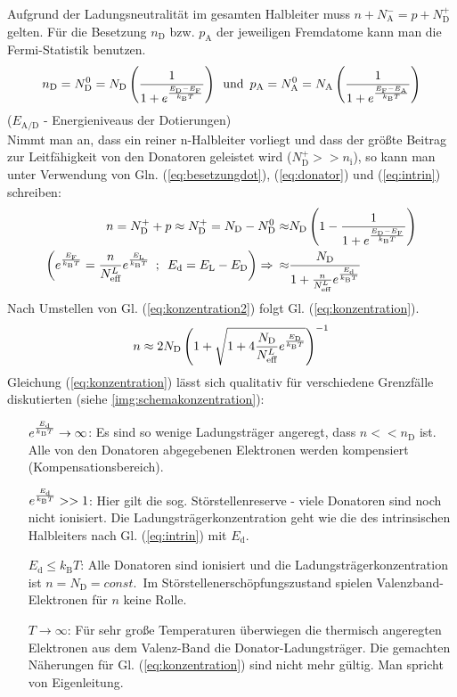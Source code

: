 \documentclass[numbers=noenddot,14pt,a4paper]{scrartcl}
\newcommand{\ix}[1]{_\text{#1}}
\newcommand{\euler}{\mathnormal{e}}
\begin{document}
Aufgrund der Ladungsneutralität im gesamten Halbleiter muss \mbox{$n+N\ix{A}^-=p+N\ix{D}^+$} gelten. Für die Besetzung $n\ix{D}$ bzw. $p\ix{A}$ der jeweiligen Fremdatome kann man die Fermi-Statistik benutzen.
\begin{align}
	n\ix{D}=N\ix{D}^0=N\ix{D}\left(\frac{1}{1+\euler^{\frac{E\ix{D}-E\ix{F}}{k\ix{B}T}}}\right) \,\,\, \text{und} \,\,\, p\ix{A}=N\ix{A}^0=N\ix{A}\left(\frac{1}{1+\euler^{\frac{E\ix{F}-E\ix{A}}{k\ix{B}T}}}\right) \label{eq:besetzungdot}
\end{align}
($E\ix{A/D}$ - Energieniveaus der Dotierungen)\\
Nimmt man an, dass ein reiner n-Halbleiter vorliegt und dass der größte Beitrag zur Leitfähigkeit von den Donatoren geleistet wird ($N\ix{D}^+>>n\ix{i}$), so kann man unter Verwendung von Gln. (\ref{eq:besetzungdot}), (\ref{eq:donator})  und (\ref{eq:intrin}) schreiben:
\begin{align}
	n=N\ix{D}^++p\approx N\ix{D}^+=N\ix{D}-N\ix{D}^0\approx& N\ix{D}\left(1-\frac{1}{1+\euler^{\frac{E\ix{D}-E\ix{F}}{k\ix{B}T}}}\right) \nonumber \\
	\left(\euler^{\frac{E\ix{F}}{k\ix{B}T}}=\frac{n}{N\ix{eff}^L}\euler^{\frac{E\ix{L}}{k\ix{B}T}} \,\,\,;\,\,\, E\ix{d}=E\ix{L}-E\ix{D}\right) \Rightarrow \,\,\,\approx& \frac{N\ix{D}}{1+\frac{n}{N\ix{eff}^L}\euler^{\frac{E\ix{d}}{k\ix{B}T}}} \label{eq:konzentration2}
\end{align}
Nach Umstellen von Gl. (\ref{eq:konzentration2}) folgt Gl. (\ref{eq:konzentration}).
\begin{align}
	n\approx 2N\ix{D}\left(1+\sqrt{1+4\frac{N\ix{D}}{N\ix{eff}^L}\euler^{\frac{
		E\ix{D}}{k\ix{B}T}}}\right)^{-1} \label{eq:konzentration}
\end{align}
Gleichung (\ref{eq:konzentration}) lässt sich qualitativ für verschiedene Grenzfälle diskutierten (siehe \ref{img:schemakonzentration}):
\begin{itemize}
	\item[$\euler^\frac{E\ix{d}}{k\ix{B}T}\rightarrow\infty$:]
		{Es sind so wenige Ladungsträger angeregt, dass $n<<n\ix{D}$ ist. Alle von den Donatoren abgegebenen Elektronen werden kompensiert (Kompensationsbereich).}
	\item[$\euler^\frac{E\ix{d}}{k\ix{B}T}>>1$:]
		{Hier gilt die sog. Störstellenreserve - viele Donatoren sind noch nicht ionisiert. Die Ladungsträgerkonzentration geht wie die des intrinsischen Halbleiters nach Gl. (\ref{eq:intrin}) mit $E\ix{d}$.}
	\item[$E\ix{d}\leq k\ix{B}T$:]
		{Alle Donatoren sind ionisiert und die Ladungsträgerkonzentration ist $n=N\ix{D}=const.\,$ Im Störstellenerschöpfungszustand spielen Valenzband-Elektronen für $n$ keine Rolle.}
	\item[$T\rightarrow\infty$:]
		{Für sehr große Temperaturen überwiegen die thermisch angeregten Elektronen aus dem Valenz-Band die Donator-Ladungsträger. Die gemachten Näherungen für Gl. (\ref{eq:konzentration}) sind nicht mehr gültig. Man spricht von Eigenleitung.}
\end{itemize}
\end{document}

